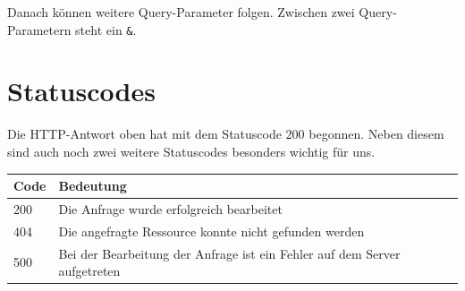 \documentclass[a4paper]{scrartcl}
\begin{document}
Danach können weitere Query-Parameter folgen.
Zwischen zwei Query-Parametern steht ein \texttt{\&}.


\section{Statuscodes}\label{sec:statuscodes}

Die HTTP-Antwort oben hat mit dem Statuscode $200$ begonnen.
Neben diesem sind auch noch zwei weitere Statuscodes besonders wichtig für uns.

\begin{table}[H]

\begin{tabular}{ll}

Code & Bedeutung \\
\hline
200 & Die Anfrage wurde erfolgreich bearbeitet  \\

404 & Die angefragte Ressource konnte nicht gefunden werden  \\

500 & Bei der Bearbeitung der Anfrage ist ein Fehler auf dem Server aufgetreten   \\

\end{tabular}\label{tab:table2}
\end{table}
\end{document}
